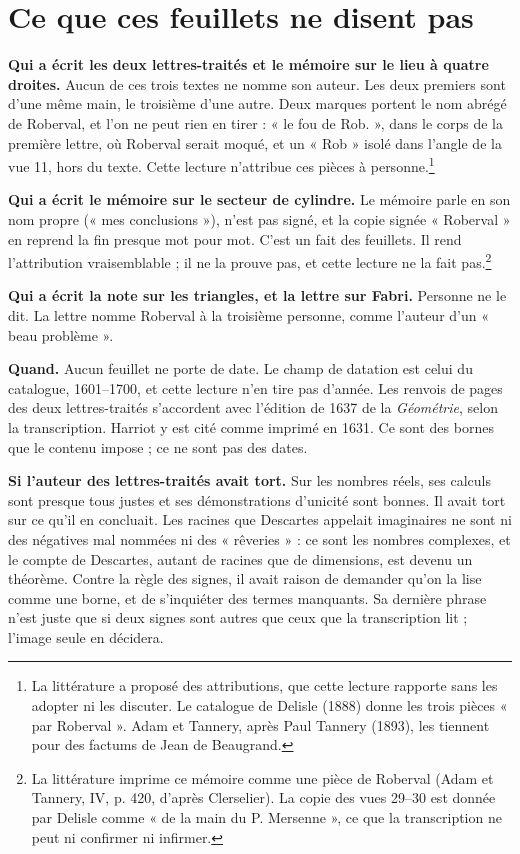 \documentclass[11pt,a4paper]{article}
\begin{document}
\section*{Ce que ces feuillets ne disent pas}

\textbf{Qui a écrit les deux lettres-traités et le mémoire sur le lieu à
quatre droites.} Aucun de ces trois textes ne nomme son auteur. Les deux
premiers sont d'une même main, le troisième d'une autre. Deux marques portent
le nom abrégé de Roberval, et l'on ne peut rien en tirer : « le fou de Rob. »,
dans le corps de la première lettre, où Roberval serait moqué, et un « Rob »
isolé dans l'angle de la vue 11, hors du texte. Cette lecture n'attribue ces
pièces à personne.\footnote{La littérature a proposé des attributions, que
cette lecture rapporte sans les adopter ni les discuter. Le catalogue de
Delisle (1888) donne les trois pièces « par Roberval ». Adam et Tannery,
après Paul Tannery (1893), les tiennent pour des factums de Jean de Beaugrand.}

\textbf{Qui a écrit le mémoire sur le secteur de cylindre.} Le mémoire parle en
son nom propre (« mes conclusions »), n'est pas signé, et la copie signée
« Roberval » en reprend la fin presque mot pour mot. C'est un fait des
feuillets. Il rend l'attribution vraisemblable ; il ne la prouve pas, et cette
lecture ne la fait pas.\footnote{La littérature imprime ce mémoire comme une
pièce de Roberval (Adam et Tannery, IV, p. 420, d'après Clerselier). La copie
des vues 29–30 est donnée par Delisle comme « de la main du P. Mersenne », ce que
la transcription ne peut ni confirmer ni infirmer.}

\textbf{Qui a écrit la note sur les triangles, et la lettre sur Fabri.}
Personne ne le dit. La lettre nomme Roberval à la troisième personne, comme
l'auteur d'un « beau problème ».

\textbf{Quand.} Aucun feuillet ne porte de date. Le champ de datation est celui
du catalogue, 1601–1700, et cette lecture n'en tire pas d'année. Les renvois
de pages des deux lettres-traités s'accordent avec l'édition de 1637 de la
\emph{Géométrie}, selon la transcription. Harriot y est cité comme imprimé en
1631. Ce sont des bornes que le contenu impose ; ce ne sont pas des dates.

\textbf{Si l'auteur des lettres-traités avait tort.} Sur les nombres réels, ses
calculs sont presque tous justes et ses démonstrations d'unicité sont bonnes.
Il avait tort sur ce qu'il en concluait. Les racines que Descartes appelait
imaginaires ne sont ni des négatives mal nommées ni des « rêveries » : ce sont
les nombres complexes, et le compte de Descartes, autant de racines que de
dimensions, est devenu un théorème. Contre la règle des signes, il avait raison
de demander qu'on la lise comme une borne, et de s'inquiéter des termes
manquants. Sa dernière phrase n'est juste que si deux signes sont autres que
ceux que la transcription lit ; l'image seule en décidera.
\end{document}
